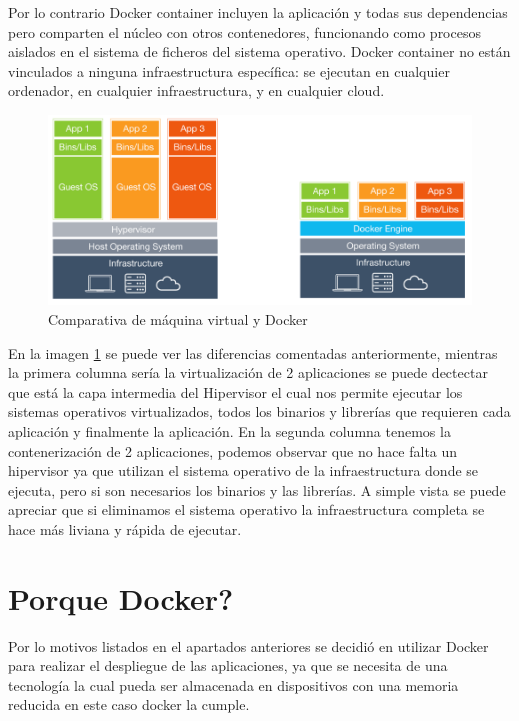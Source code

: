 Por lo contrario Docker container incluyen la aplicación y todas sus dependencias pero comparten el núcleo con otros contenedores, funcionando como procesos aislados en el sistema de ficheros del sistema operativo. Docker container no están vinculados a ninguna infraestructura específica: se ejecutan en cualquier ordenador, en cualquier infraestructura, y en cualquier cloud.

\begin{figure}[htb]
\begin{center}
\includegraphics[width=1\textwidth]{./setup/VrvsDocker}
\caption{Comparativa de máquina virtual y Docker}
\label{Vs:VrvsDocker}
\end{center}
\end{figure}

En la imagen \ref{Vs:VrvsDocker} se puede ver las diferencias comentadas anteriormente, mientras la primera columna sería la virtualización de 2 aplicaciones se puede dectectar que está la capa intermedia del Hipervisor el cual nos permite ejecutar los sistemas operativos virtualizados, todos los binarios y librerías que requieren cada aplicación y finalmente la aplicación. 
En la segunda columna tenemos la contenerización de 2 aplicaciones, podemos observar que no hace falta un hipervisor ya que utilizan el sistema operativo de la infraestructura donde se ejecuta, pero si son necesarios los binarios y las librerías.
A simple vista se puede apreciar que si eliminamos el sistema operativo la infraestructura completa se hace más liviana y rápida de ejecutar.

\section{Porque Docker?}

Por lo motivos listados en el apartados anteriores se decidió en utilizar Docker para realizar el despliegue de las aplicaciones, ya que se necesita de una tecnología la cual pueda ser almacenada en dispositivos con una memoria reducida en este caso docker la cumple. 

